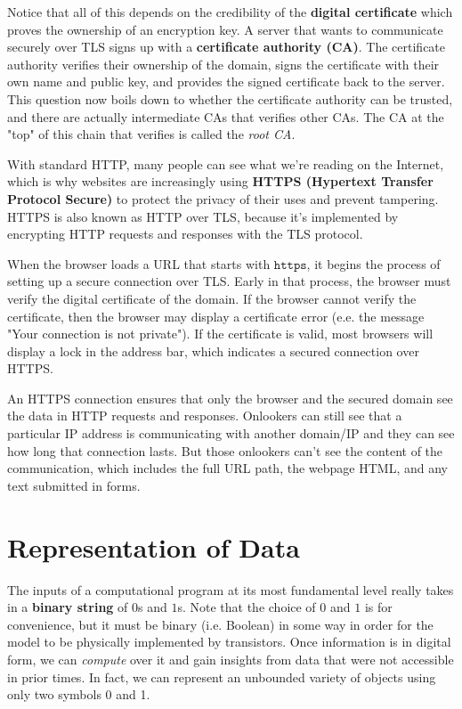 \documentclass[a4paper, 12pt]{report}
\theoremstyle{remark}
\theoremstyle{definition}
\begin{document}
Notice that all of this depends on the credibility of the \textbf{digital certificate} which proves the ownership of an encryption key. A server that wants to communicate securely over TLS signs up with a \textbf{certificate authority (CA)}. The certificate authority verifies their ownership of the domain, signs the certificate with their own name and public key, and provides the signed certificate back to the server. This question now boils down to whether the certificate authority can be trusted, and there are actually intermediate CAs that verifies other CAs. The CA at the "top" of this chain that verifies is called the \textit{root CA}. 

With standard HTTP, many people can see what we're reading on the Internet, which is why websites are increasingly using \textbf{HTTPS (Hypertext Transfer Protocol Secure)} to protect the privacy of their uses and prevent tampering. HTTPS is also known as HTTP over TLS, because it's implemented by encrypting HTTP requests and responses with the TLS protocol. 

When the browser loads a URL that starts with $\texttt{https}$, it begins the process of setting up a secure connection over TLS. Early in that process, the browser must verify the digital certificate of the domain. If the browser cannot verify the certificate, then the browser may display a certificate error (e.e. the message "Your connection is not private"). If the certificate is valid, most browsers will display a lock in the address bar, which indicates a secured connection over HTTPS. 

An HTTPS connection ensures that only the browser and the secured domain see the data in HTTP requests and responses. Onlookers can still see that a particular IP address is communicating with another domain/IP and they can see how long that connection lasts. But those onlookers can't see the content of the communication, which includes the full URL path, the webpage HTML, and any text submitted in forms. 

\section{Representation of Data}
The inputs of a computational program at its most fundamental level really takes in a \textbf{binary string} of $0$s and $1$s. Note that the choice of $0$ and $1$ is for convenience, but it must be binary (i.e. Boolean) in some way in order for the model to be physically implemented by transistors. Once information is in digital form, we can \textit{compute} over it and gain insights from data that were not accessible in prior times. In fact, we can represent an unbounded variety of objects using only two symbols 0 and 1. 
\end{document}
